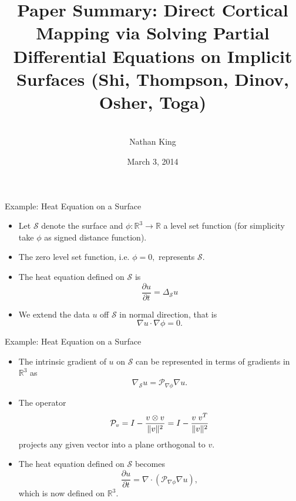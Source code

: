 \documentclass{beamer}
\title[Brain Mapping] %
{Paper Summary: Direct Cortical Mapping via Solving Partial Differential Equations on Implicit Surfaces (Shi, Thompson, Dinov, Osher, Toga)}
\author[King] %
{\vspace{1cm}\\
Nathan King}
\institute[SFU] %
{
  Department of Mathematics\\
Simon Fraser University\\
 }
\date[March 3, 2014] %
{March 3, 2014}
\begin{document}
  
  
  
\begin{frame}
  \titlepage
\end{frame}







\begin{frame}{Example: Heat Equation on a Surface}
\begin{itemize}
\item Let $\mathcal{S}$ denote the surface and $\phi : \mathbb{R}^3 \rightarrow \mathbb{R}$ a level set function (for simplicity take $\phi$ as signed distance function).
\item  The zero level set function, i.e. $\phi=0,$ represents $\mathcal{S}.$ 

\item The heat equation defined on $\mathcal{S}$ is $$\frac{\partial u}{\partial t} =\Delta_{\mathcal{S}} u$$

\item We extend the data $u$ off $\mathcal{S}$ in normal direction, that is $$\nabla u \cdot \nabla \phi=0.$$
\end{itemize}
\end{frame}


\begin{frame}{Example: Heat Equation on a Surface}
\begin{itemize}
\item  The intrinsic gradient of $u$ on $\mathcal{S}$ can be represented in terms of gradients in $\mathbb{R}^3$ as $$\nabla_{\mathcal{S}} u = \mathcal{P}_{\nabla \phi} \nabla u.$$

\item The operator $$\mathcal{P}_v=I-\frac{v\otimes v}{\| v \|^2}=I-\frac{v \hspace{0.1cm} v^T}{\| v \|^2}$$ projects any given vector into a plane orthogonal to $v.$

\item The heat equation defined on $\mathcal{S}$ becomes $$\frac{\partial u}{\partial t} =\nabla \cdot(\mathcal{P}_{\nabla \phi} \nabla u),$$ which is now defined on $\mathbb{R}^3.$

\end{itemize}
\end{frame}
\end{document}
